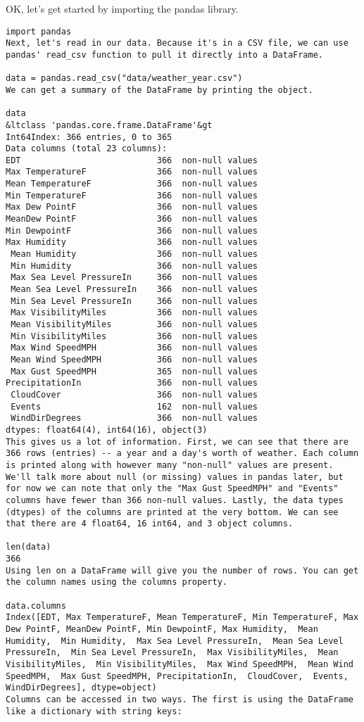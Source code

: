 OK, let's get started by importing the pandas library.
\begin{framed}
\begin{verbatim}
import pandas
Next, let's read in our data. Because it's in a CSV file, we can use pandas' read_csv function to pull it directly into a DataFrame.

data = pandas.read_csv("data/weather_year.csv")
We can get a summary of the DataFrame by printing the object.

data
&ltclass 'pandas.core.frame.DataFrame'&gt
Int64Index: 366 entries, 0 to 365
Data columns (total 23 columns):
EDT                           366  non-null values
Max TemperatureF              366  non-null values
Mean TemperatureF             366  non-null values
Min TemperatureF              366  non-null values
Max Dew PointF                366  non-null values
MeanDew PointF                366  non-null values
Min DewpointF                 366  non-null values
Max Humidity                  366  non-null values
 Mean Humidity                366  non-null values
 Min Humidity                 366  non-null values
 Max Sea Level PressureIn     366  non-null values
 Mean Sea Level PressureIn    366  non-null values
 Min Sea Level PressureIn     366  non-null values
 Max VisibilityMiles          366  non-null values
 Mean VisibilityMiles         366  non-null values
 Min VisibilityMiles          366  non-null values
 Max Wind SpeedMPH            366  non-null values
 Mean Wind SpeedMPH           366  non-null values
 Max Gust SpeedMPH            365  non-null values
PrecipitationIn               366  non-null values
 CloudCover                   366  non-null values
 Events                       162  non-null values
 WindDirDegrees               366  non-null values
dtypes: float64(4), int64(16), object(3)
This gives us a lot of information. First, we can see that there are 366 rows (entries) -- a year and a day's worth of weather. Each column is printed along with however many "non-null" values are present. We'll talk more about null (or missing) values in pandas later, but for now we can note that only the "Max Gust SpeedMPH" and "Events" columns have fewer than 366 non-null values. Lastly, the data types (dtypes) of the columns are printed at the very bottom. We can see that there are 4 float64, 16 int64, and 3 object columns.

len(data)
366
Using len on a DataFrame will give you the number of rows. You can get the column names using the columns property.

data.columns
Index([EDT, Max TemperatureF, Mean TemperatureF, Min TemperatureF, Max Dew PointF, MeanDew PointF, Min DewpointF, Max Humidity,  Mean Humidity,  Min Humidity,  Max Sea Level PressureIn,  Mean Sea Level PressureIn,  Min Sea Level PressureIn,  Max VisibilityMiles,  Mean VisibilityMiles,  Min VisibilityMiles,  Max Wind SpeedMPH,  Mean Wind SpeedMPH,  Max Gust SpeedMPH, PrecipitationIn,  CloudCover,  Events,  WindDirDegrees], dtype=object)
Columns can be accessed in two ways. The first is using the DataFrame like a dictionary with string keys:


\end{verbatim}
\end{framed}
